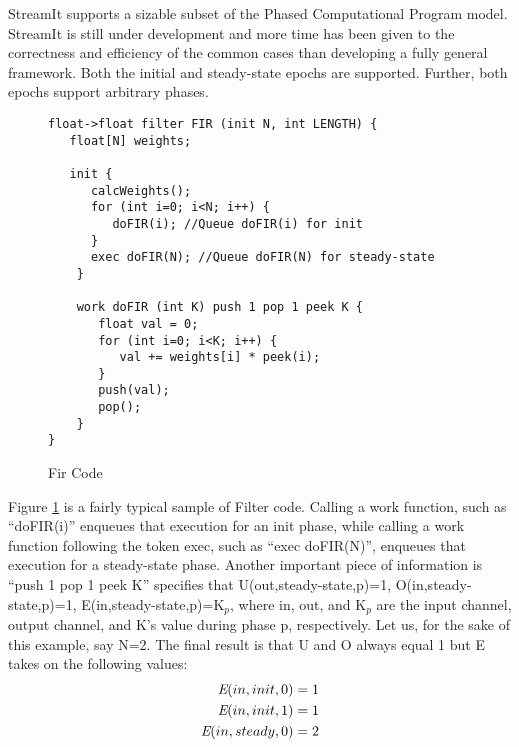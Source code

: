 StreamIt supports a sizable subset of the Phased Computational Program model. StreamIt is still under development and more time has been given to the correctness and efficiency of the common cases than developing a fully general framework. Both the initial and steady-state epochs are supported. Further, both epochs support arbitrary phases.
\begin{figure}[t]
\begin{verbatim}
float->float filter FIR (init N, int LENGTH) {
   float[N] weights;

   init {
      calcWeights();
      for (int i=0; i<N; i++) {
         doFIR(i); //Queue doFIR(i) for init
      }
      exec doFIR(N); //Queue doFIR(N) for steady-state
    }

    work doFIR (int K) push 1 pop 1 peek K {
       float val = 0;
       for (int i=0; i<K; i++) {
          val += weights[i] * peek(i);
       }
       push(val);
       pop();
    }
}
\end{verbatim}
\caption{Fir Code
\protect\label{fig:fir}}
\end{figure}

Figure \ref{fig:fir} is a fairly typical sample of Filter code. Calling a work function, such as ``doFIR(i)'' enqueues that execution for an init phase, while calling a work function following the token exec, such as ``exec doFIR(N)'', enqueues that execution for a steady-state phase. Another important piece of information is ``push 1 pop 1 peek K'' specifies that U(out,steady-state,p)=1, O(in,steady-state,p)=1, E(in,steady-state,p)=K$_p$, where in, out, and K$_p$ are the input channel, output channel, and K's value during phase p, respectively. Let us, for the sake of this example, say N=2. The final result is that U and O always equal 1 but E takes on the following values:
\begin{align}
\mbox{\it E}(in,init,0)&=1\nonumber\\
\mbox{\it E}(in,init,1)&=1\nonumber\\
\mbox{\it E}(in,steady,0)&=2\nonumber
\end{align}

